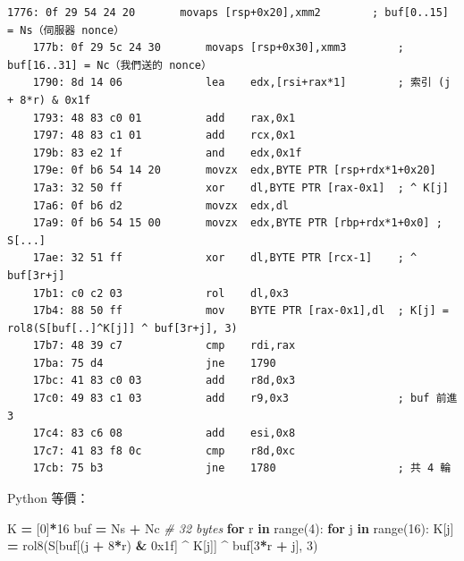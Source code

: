 \documentclass[10pt,a4paper]{article}
\newenvironment{Shaded}{\begin{snugshade}}{\end{snugshade}}
\newcommand{\BaseNTok}[1]{\textcolor[rgb]{0.00,0.00,0.81}{#1}}
\newcommand{\BuiltInTok}[1]{#1}
\newcommand{\CommentTok}[1]{\textcolor[rgb]{0.56,0.35,0.01}{\textit{#1}}}
\newcommand{\ControlFlowTok}[1]{\textcolor[rgb]{0.13,0.29,0.53}{\textbf{#1}}}
\newcommand{\DecValTok}[1]{\textcolor[rgb]{0.00,0.00,0.81}{#1}}
\newcommand{\KeywordTok}[1]{\textcolor[rgb]{0.13,0.29,0.53}{\textbf{#1}}}
\newcommand{\NormalTok}[1]{#1}
\newcommand{\OperatorTok}[1]{\textcolor[rgb]{0.81,0.36,0.00}{\textbf{#1}}}
\renewenvironment{Shaded}{%
  \def\FrameCommand{\fboxsep=3.2pt\colorbox{shadecolor}}%
  \MakeFramed{\advance\hsize-\width\FrameRestore\small}%
}{%
  \endMakeFramed
}
\begin{document}
\begin{Verbatim}[breaklines=true,breakanywhere=true,breakautoindent=false,fontsize=\fontsize{7.0}{9.5}\selectfont]
    1776: 0f 29 54 24 20       movaps [rsp+0x20],xmm2        ; buf[0..15]  = Ns（伺服器 nonce）
    177b: 0f 29 5c 24 30       movaps [rsp+0x30],xmm3        ; buf[16..31] = Nc（我們送的 nonce）
    1790: 8d 14 06             lea    edx,[rsi+rax*1]        ; 索引 (j + 8*r) & 0x1f
    1793: 48 83 c0 01          add    rax,0x1
    1797: 48 83 c1 01          add    rcx,0x1
    179b: 83 e2 1f             and    edx,0x1f
    179e: 0f b6 54 14 20       movzx  edx,BYTE PTR [rsp+rdx*1+0x20]
    17a3: 32 50 ff             xor    dl,BYTE PTR [rax-0x1]  ; ^ K[j]
    17a6: 0f b6 d2             movzx  edx,dl
    17a9: 0f b6 54 15 00       movzx  edx,BYTE PTR [rbp+rdx*1+0x0] ; S[...]
    17ae: 32 51 ff             xor    dl,BYTE PTR [rcx-1]    ; ^ buf[3r+j]
    17b1: c0 c2 03             rol    dl,0x3
    17b4: 88 50 ff             mov    BYTE PTR [rax-0x1],dl  ; K[j] = rol8(S[buf[..]^K[j]] ^ buf[3r+j], 3)
    17b7: 48 39 c7             cmp    rdi,rax
    17ba: 75 d4                jne    1790
    17bc: 41 83 c0 03          add    r8d,0x3
    17c0: 49 83 c1 03          add    r9,0x3                 ; buf 前進 3
    17c4: 83 c6 08             add    esi,0x8
    17c7: 41 83 f8 0c          cmp    r8d,0xc
    17cb: 75 b3                jne    1780                   ; 共 4 輪
\end{Verbatim}

Python 等價：

\begin{Shaded}
\begin{Highlighting}[]
\NormalTok{K }\OperatorTok{=}\NormalTok{ [}\DecValTok{0}\NormalTok{]}\OperatorTok{*}\DecValTok{16}
\NormalTok{buf }\OperatorTok{=}\NormalTok{ Ns }\OperatorTok{+}\NormalTok{ Nc                       }\CommentTok{\# 32 bytes}
\ControlFlowTok{for}\NormalTok{ r }\KeywordTok{in} \BuiltInTok{range}\NormalTok{(}\DecValTok{4}\NormalTok{):}
    \ControlFlowTok{for}\NormalTok{ j }\KeywordTok{in} \BuiltInTok{range}\NormalTok{(}\DecValTok{16}\NormalTok{):}
\NormalTok{        K[j] }\OperatorTok{=}\NormalTok{ rol8(S[buf[(j }\OperatorTok{+} \DecValTok{8}\OperatorTok{*}\NormalTok{r) }\OperatorTok{\&} \BaseNTok{0x1f}\NormalTok{] }\OperatorTok{\^{}}\NormalTok{ K[j]] }\OperatorTok{\^{}}\NormalTok{ buf[}\DecValTok{3}\OperatorTok{*}\NormalTok{r }\OperatorTok{+}\NormalTok{ j], }\DecValTok{3}\NormalTok{)}
\end{Highlighting}
\end{Shaded}
\end{document}

